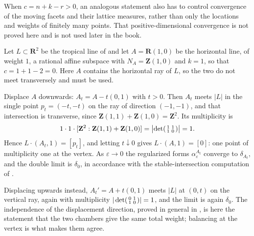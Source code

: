 \begin{remark}
\label{rem:ch11-stable-positive-dim}
When $c=n+k-r>0$, an analogous statement also has to control convergence of
the moving facets and their lattice measures, rather than only the locations
and weights of finitely many points.  That positive-dimensional convergence
is not proved here and is not used later in the book.
\end{remark}

\begin{example}
\label{ex:ch11-two-lines-current}
Let $L\subset\mathbf R^2$ be the tropical line of
 and let $A=\mathbf R(1,0)$ be the
horizontal line, of weight $1$, a rational affine subspace with
$N_A=\mathbf Z(1,0)$ and $k=1$, so that $c=1+1-2=0$.  Here $A$ contains the
horizontal ray of $L$, so the two do not meet transversely and
 must be used.

Displace $A$ downwards: $A_t=A-t(0,1)$ with $t>0$.  Then $A_t$ meets $|L|$
in the single point $p_t=(-t,-t)$ on the ray of direction $(-1,-1)$, and
that intersection is transverse, since
$\mathbf Z(1,1)+\mathbf Z(1,0)=\mathbf Z^2$.  Its multiplicity is
\[
 1\cdot1\cdot[\mathbf Z^2:\mathbf Z(1,1)+\mathbf Z(1,0)]
 =\bigl|\det\begin{psmallmatrix}1&1\\1&0\end{psmallmatrix}\bigr|=1 .
\]
Hence $L\cdot(A_t,1)=[p_t]$, and letting $t\downarrow0$ gives
$L\cdot(A,1)=[0]$: one point of multiplicity one at the vertex.  As
$\varepsilon\to0$ the regularized forms $\alpha^{A_t}_\varepsilon$ converge
to $\delta_{A_t}$, and the double limit is $\delta_0$, in accordance with
the stable-intersection computation of .

Displacing upwards instead, $A_t'=A+t(0,1)$ meets $|L|$ at $(0,t)$ on the
vertical ray, again with multiplicity
$|\det\begin{psmallmatrix}0&1\\1&0\end{psmallmatrix}|=1$, and the limit is
again $\delta_0$.  The independence of the displacement direction, proved in
general in , is here the statement
that the two chambers give the same total weight; balancing at the vertex is
what makes them agree.
\end{example}

